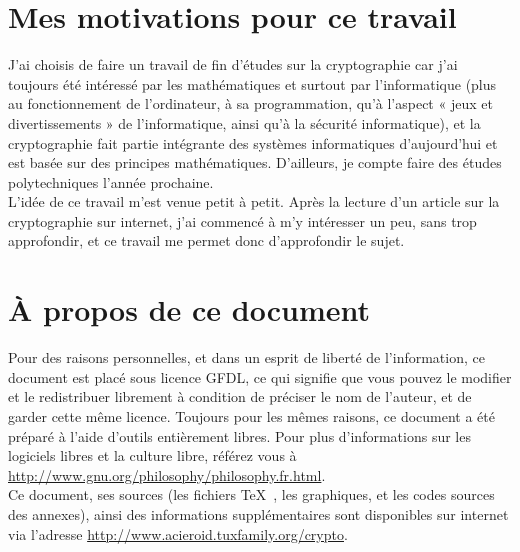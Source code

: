 
\section{Mes motivations pour ce travail}
J'ai choisis de faire un travail de fin d'études sur la cryptographie
car j'ai toujours été intéressé par les mathématiques et surtout par
l'informatique (plus au fonctionnement de l'ordinateur, à sa
programmation, qu'à l'aspect « jeux et divertissements » de
l'informatique, ainsi qu'à la sécurité informatique), 
et la cryptographie fait partie intégrante des
systèmes informatiques d'aujourd'hui et est basée sur des principes
mathématiques. D'ailleurs, je compte faire des études polytechniques
l'année prochaine. \\ L'idée de ce travail m'est venue petit à
petit. Après la lecture d'un article sur la cryptographie sur
internet, j'ai commencé à m'y intéresser un peu, sans trop
approfondir, et ce travail me permet donc d'approfondir le sujet.

\section{À propos de ce document}
Pour des raisons personnelles, et dans un esprit de liberté de
l'information, ce document est placé sous licence GFDL, ce qui
signifie que vous pouvez le modifier et le redistribuer librement à
condition de préciser le nom de l'auteur, et de garder cette même
licence. Toujours pour les mêmes raisons, ce document a été préparé à
l'aide d'outils entièrement libres.
Pour plus d'informations sur les logiciels libres et la culture
libre, référez vous à \url{http://www.gnu.org/philosophy/philosophy.fr.html}. \\
Ce document, ses sources (les fichiers \TeX~, les graphiques, et les
codes sources des annexes), ainsi des informations supplémentaires
sont disponibles sur internet via l'adresse
\url{http://www.acieroid.tuxfamily.org/crypto}. \\


